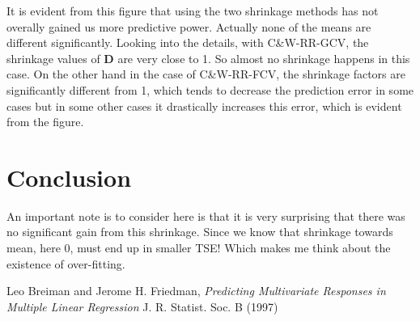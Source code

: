 \documentclass[a4paper]{article}
\begin{document}
It is evident from this figure that using the two shrinkage methods has not overally gained us more predictive power. Actually none of the means are different significantly. Looking into the details, with C\&W-RR-GCV, the shrinkage values of $\mathbf{D}$ are very close to 1. So almost no shrinkage happens in this case. On the other hand in the case of C\&W-RR-FCV, the shrinkage factors are significantly different from 1, which tends to decrease the prediction error in some cases but in some other cases it drastically increases this error, which is evident from the figure.

\section{Conclusion}
An important note is to consider here is that it is very surprising that there was no significant gain from this shrinkage. Since we know that shrinkage towards mean, here 0, must end up in smaller TSE! Which makes me think about the existence of over-fitting. 


\begin{thebibliography}{9}
Leo Breiman and Jerome H. Friedman,
\emph{Predicting Multivariate Responses in Multiple Linear Regression}
J. R. Statist. Soc. B (1997)


\end{thebibliography}
\end{document}
